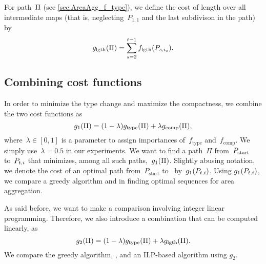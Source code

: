 For path~$\Pi$ (see \sect\ref{sec:AreaAgg_f_type}), 
we define the cost of length over all 
intermediate maps 
(that is, neglecting~$P_{1,1}$ 
and the last subdivison in the path) by
\begin{equation}
\label{eq:g_length}
g_\mathrm{lgth}(\Pi)=
\sum_{s=2}^{t-1}f_{\mathrm{lgth}}(P_{s,i_s}).
\end{equation}



\subsection{Combining cost functions}
\label{sec:AreaAgg_Combining}
In order to minimize the type change 
and maximize the compactness,
we combine the two cost functions as
\begin{equation}
\label{eq:g_1}
g_1(\Pi)= (1-\lambda)g_\mathrm{type}(\Pi)
+\lambda g_\mathrm{comp}(\Pi),
\end{equation}
where~$\lambda \in [0,1]$ is a parameter 
to assign importances 
of~$f_\mathrm{type}$ and~$f_\mathrm{comp}$.
We simply use~$\lambda=0.5$ in our experiments. 
We want to find a path~$\Pi$ from~$P_\mathrm{start}$ to~$P_{t,i}$ 
that minimizes, among all such paths,~$g_1(\Pi)$.
Slightly abusing notation, we denote the cost of
an optimal path from~${P}_{\mathrm{start}}$ to~\Pnode 
by~$g_1(P_{t,i})$.
Using $g_1(P_{t,i})$, we compare a greedy algorithm and \Astar
in finding optimal sequences for area aggregation.

As said before, we want to make a comparison involving
integer linear programming.
Therefore, we also introduce a combination
that can be computed linearly, as
\begin{equation}
\label{eq:g_2}
g_2(\Pi)= (1-\lambda)g_\mathrm{type}(\Pi)
+\lambda g_\mathrm{lgth}(\Pi).
\end{equation}
We compare the greedy algorithm, \Astar, and an ILP-based 
algorithm using $g_2$.


